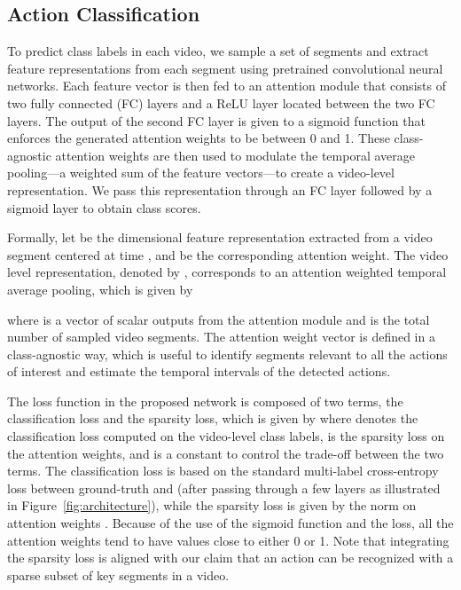 \documentclass[10pt,twocolumn,letterpaper]{article}
\begin{document}
\subsection{Action Classification}
\label{sub:weakly}
To predict class labels in each video, we sample a set of segments and extract feature representations from each segment using pretrained convolutional neural networks.
Each feature vector is then fed to an attention module that consists of two fully connected (FC) layers and a ReLU layer located between the two FC layers.
The output of the second FC layer is given to a sigmoid function that enforces the generated attention weights to be between 0 and 1.
These class-agnostic attention weights are then used to modulate the temporal average pooling---a weighted sum of the feature vectors---to create a video-level representation.
We pass this representation through an FC layer followed by a sigmoid layer to obtain class scores.


Formally, let  be the  dimensional feature representation extracted from a video segment centered at time , and  be the corresponding attention weight. 
The video level representation, denoted by , corresponds to an attention weighted temporal average pooling, which is given by

where  is a vector of scalar outputs from the attention module and  is the total number of sampled video segments.
The attention weight vector  is defined in a class-agnostic way, which is useful to identify segments relevant to all the actions of interest and estimate the temporal intervals of the detected actions.


The loss function in the proposed network is composed of two terms, the classification loss and the sparsity loss, which is given by
where  denotes the classification loss computed on the video-level class labels,  is the sparsity loss on the attention weights, and  is a constant to control the trade-off between the two terms.
The classification loss is based on the standard multi-label cross-entropy loss between ground-truth and  (after passing through a few layers as illustrated in Figure~\ref{fig:architecture}), while the sparsity loss is given by the  norm on attention weights .
Because of the use of the sigmoid function and the  loss, all the attention weights tend to have values close to either 0 or 1.
Note that integrating the sparsity loss is aligned with our claim that an action can be recognized with a sparse subset of key segments in a video.
\end{document}
